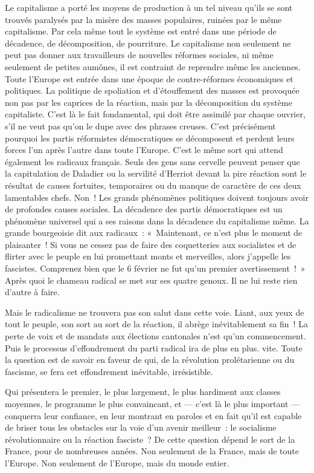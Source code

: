 \documentclass[french,twoside]{book} %
\begin{document}
Le capitalisme a porté les moyens de production à un tel niveau qu’ils se sont trouvés paralysés par la misère des masses populaires, ruinées par le même capitalisme. Par cela même tout le système est entré dans une période de décadence, de décomposition, de pourriture. Le capitalisme non seulement ne peut pas donner aux travailleurs de nouvelles réformes sociales, ni même seulement de petites aumônes, il est contraint de reprendre même les anciennes. Toute l’Europe est entrée dans une époque de contre-réformes économiques et politiques. La politique de spoliation  et d’étouffement des masses est provoquée non pas par les caprices de la réaction, mais par la décomposition du système capitaliste. C’est là le fait fondamental, qui doit être assimilé par chaque ouvrier, s’il ne veut pas qu’on le dupe avec des phrases creuses. C’est précisément pourquoi les partis réformistes démocratiques se décomposent et perdent leurs forces l’un après l’autre dans toute l’Europe. C’est le même sort qui attend également les radicaux français. Seuls des gens sans cervelle peuvent penser que la capitulation de Daladier ou la servilité d’Herriot devant la pire réaction sont le résultat de causes fortuites, temporaires ou du manque de caractère de ces deux lamentables chefs. Non ! Les grands phénomènes politiques doivent toujours avoir de profondes causes sociales. La décadence des partis démocratiques est un phénomène universel qui a ses raisons dans la décadence du capitalisme même. La grande bourgeoisie dit aux radicaux : « Maintenant, ce n’est plus le moment de plaisanter ! Si vous ne cessez pas de faire des coquetteries aux socialistes et de flirter avec le peuple en lui promettant monts et merveilles, alors j’appelle les fascistes. Comprenez bien que le 6 février ne fut qu’un premier avertissement ! » Après quoi le chameau radical se met sur ses quatre genoux. Il ne lui reste rien d’autre à faire.\par
Mais le radicalisme ne trouvera pas son salut dans cette voie. Liant, aux yeux de tout le peuple, son sort au sort de la réaction, il abrège inévitablement sa fin ! La perte de voix et de mandats aux élections cantonales n’est qu’un commencement. Puis le processus d’effondrement du parti radical ira de plus en plus. vite. Toute la question est de savoir en faveur de qui, de la révolution prolétarienne ou du fascisme, se fera cet effondrement inévitable, irrésistible.\par
Qui présentera le premier, le plus largement, le plus hardiment aux classes moyennes, le programme le plus  convaincant, et — c’est là le plus important — conquerra leur confiance, en leur montrant en paroles et en fait qu’il est capable de briser tous les obstacles sur la voie d’un avenir meilleur : le socialisme révolutionnaire ou la réaction fasciste ? De cette question dépend le sort de la France, pour de nombreuses années. Non seulement de la France, mais de toute l’Europe. Non seulement de l’Europe, mais du monde entier.
\end{document}
